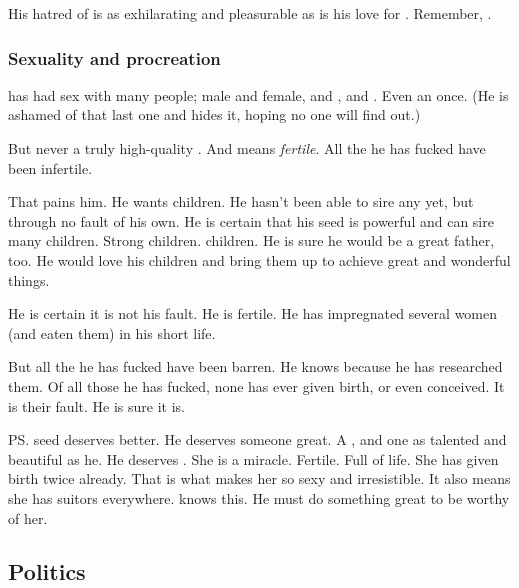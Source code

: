 His hatred of \Ishnaruchaefir is as exhilarating and pleasurable as is his love for \Firaxel. 
Remember, .





\subsubsection{Sexuality and procreation}
\Teshrial{} has had sex with many people; male and female, \ketherain and \thelyadeth{}, \humans{} and \nephilim. 
Even an \ashenblood{} \resvil{} once. 
(He is ashamed of that last one and hides it, hoping no one will find out.)

But never a truly high-quality \ketheran{} \resvil. 
And  means \emph{fertile}. 
All the \resviel{} he has fucked have been infertile. 

That pains him. 
He wants children. 
He hasn't been able to sire any yet, but through no fault of his own. 
He is certain that his seed is powerful and can sire many \resphan{} children. 
Strong children. 
\Ketheran{} children. 
He is sure he would be a great father, too. 
He would love his children and bring them up to achieve great and wonderful things. 

He is certain it is not his fault. 
He is fertile. 
He has impregnated several \human{} women (and eaten them) in his short life. 

But all the \resviel{} he has fucked have been barren. 
He knows because he has researched them. 
Of all those he has fucked, none has ever given birth, or even conceived. 
It is their fault. 
He is sure it is. 
\begin{prose}
\end{prose}

\ps{\Teshrial} seed deserves better. 
He deserves someone great. 
A \ketheran, and one as talented and beautiful as he. 
He deserves . 
She is a miracle. 
Fertile. 
Full of life. 
She has given birth twice already. 
That is what makes her so sexy and irresistible. 
It also means she has suitors everywhere. 
\Teshrial{} knows this. 
He must do something great to be worthy of her. 







\subsection{Politics}
